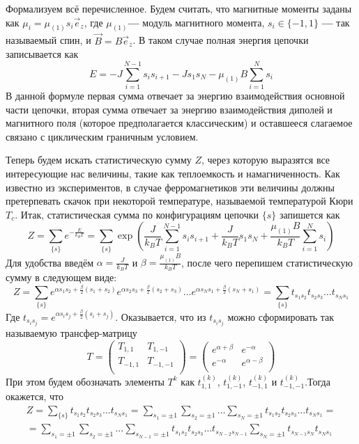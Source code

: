 \documentclass[oneside,final,14pt]{extarticle}
\begin{document}
	Формализуем всё перечисленное. Будем считать, что магнитные моменты заданы как $\mu_{i}=\mu_{(1)}s_{i}\vec e_{z}$, где $\mu_{(1)}$\textbf{---} модуль магнитного момента, $s_{i} \in \{-1, 1\}$ \textbf{---} так называемый спин, и $\vec B=B\vec e_{z}$. В таком случае полная энергия цепочки записывается как 
$$E=-J\sum_{i=1}^{N-1}s_{i}s_{i+1}-Js_{1}s_{N}-\mu_{(1)}B\sum_{i=1}^{N}s_{i}$$
	В данной формуле первая сумма отвечает за энергию взаимодействия основной части цепочки, вторая сумма отвечает за энергию взаимодействия диполей и магнитного поля (которое предполагается классическим) и оставшееся слагаемое связано с циклическим граничным условием. 

	Теперь будем искать статистическую сумму $Z$, через которую выразятся все интересующие нас величины, такие как теплоемкость и намагниченность. Как известно из экспериментов, в случае ферромагнетиков эти величины должны претерпевать скачок при некоторой температуре, называемой температурой Кюри $T_{c}$. Итак, статистическая сумма по конфигурациям цепочки $\{s\}$ запишется как
$$Z=\sum_{\{s\}}e^{-\frac{E}{k_{B}T}}=\sum_{\{s\}}\exp\left(\frac{J}{k_{B}T}\sum_{i=1}^{N-1}s_{i}s_{i+1}+\frac{J}{k_{B}T}s_{1}s_{N}+\frac{\mu_{(1)}B}{k_{B}T}\sum_{i=1}^{N}s_{i}\right)$$
	Для удобства введём $\alpha=\frac{J}{k_{B}T}$ и $\beta=\frac{\mu_{(1)}B}{k_{B}T}$, после чего перепишем статистическую сумму в следующем виде:
$$Z=\sum_{\{s\}}e^{\alpha s_{1}s_{2}+\frac{\beta}{2}(s_{1}+s_{2})}e^{\alpha s_{2}s_{3}+\frac{\beta}{2}(s_{2}+s_{3})}\ldots e^{\alpha s_{N}s_{1}+\frac{\beta}{2}(s_{N}+s_{1})}=\sum_{\{s\}}t_{s_{1}s_{2}}t_{s_{2}s_{3}}\ldots t_{s_{N}s_{1}}$$
	Где $t_{s_{i}s_{j}}=e^{\alpha s_{i}s_{j}+\frac{\beta}{2}(s_{i}+s_{j})}$. Оказывается, что из $t_{s_{i}s_{j}}$ можно сформировать так называемую трансфер-матрицу 
$$T=
\begin{pmatrix}
T_{1, 1} & T_{1, -1} \\
T_{-1, 1} & T_{-1, -1} \\
\end{pmatrix}=
\begin{pmatrix}
e^{\alpha+\beta} & e^{-\alpha} \\
e^{-\alpha} & e^{\alpha-\beta} \\
\end{pmatrix}$$
	При этом будем обозначать элементы $T^{k}$ как $t^{(k)}_{1, 1}$, $t^{(k)}_{1, -1}$, $t^{(k)}_{-1, 1}$ и $t^{(k)}_{-1, -1}$.Тогда окажется, что 
\begin{multline*}
Z=\sum_{\{s\}}t_{s_{1}s_{2}}t_{s_{2}s_{3}}\ldots t_{s_{N}s_{1}}=\sum_{s_{1}=\pm 1}\sum_{s_{2}=\pm 1}\ldots\sum_{s_{N}=\pm 1}t_{s_{1}s_{2}}t_{s_{2}s_{3}}\ldots t_{s_{N}s_{1}}= \\= \sum_{s_{1}=\pm 1}\sum_{s_{2}=\pm 1}\ldots\sum_{s_{N-1}=\pm 1}t_{s_{1}s_{2}}t_{s_{2}s_{3}}\ldots t_{s_{N-2}s_{N-1}}\sum_{s_{N}=\pm 1}t_{s_{N-1}s_{N}}t_{s_{N}s_{1}}
\end{multline*}
\end{document}
